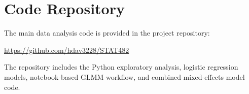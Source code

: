 \documentclass[11pt]{article}
\begin{document}
\newpage



\newpage
\section*{Code Repository}
The main data analysis code is provided in the project repository:
\begin{center}
\url{https://github.com/hdav3228/STAT482}
\end{center}
The repository includes the Python exploratory analysis, logistic regression
models, notebook-based GLMM workflow, and combined mixed-effects model code.
\end{document}
